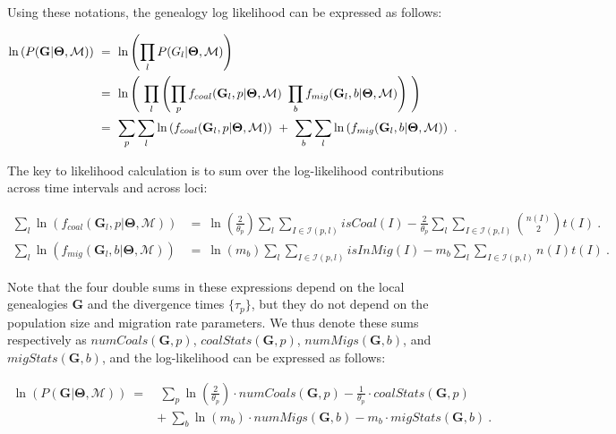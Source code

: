 \documentclass[11pt]{article}
\newcommand{\vect}[1]{\boldsymbol{\mathbf{#1}}}
\newcommand{\M}{\mathcal{M}}
\newcommand{\G}{\vect{G}}
\newcommand{\T}{\vect{\Theta}}
\newcommand{\Ip}{\mathcal{I}(p,l)}
\newcommand{\Ib}{\mathcal{I}(b,l)}
\newcommand{\1}{\mathbbm{1}}
\begin{document}
Using these notations, the genealogy log likelihood can be expressed as follows:
%
%
\begin{small}
\begin{align}
\ln \left( P(\G| \T,\M) \right) ~&=~ \ln \left( \prod_{l}  P(G_l| \T,\M) \right)  \notag \\ 
%
&=~  \ln \left( ~\prod_{l}  \left( \prod_{p} f_{coal}(\G_l,p|\T,\M) ~ \prod_{b} f_{mig}(\G_l,b|\T,\M) \right) ~\right) \notag \\ 
%
&=~  \sum_{p}\sum_{l}\ln \left( f_{coal}(\G_l,p|\T,\M) \right) ~ + ~ \sum_{b}\sum_{l}\ln \left( f_{mig}(\G_l,b|\T,\M) \right)~. 
\label{eqn:ld-details}
\end{align}
\end{small}

The key to likelihood calculation is to sum over the log-likelihood contributions across time intervals and across loci:
%
%
\begin{small}
\begin{align}
\sum_{l}\ln \left( f_{coal}(\G_l,p|\T,\M) \right) &=~ %
\ln\left( \frac{2}{\theta_p}\right) \sum_{l} \sum_{I \in \Ip} isCoal(I)  - \frac{2}{\theta_p} \sum_{l} \sum_{I \in \Ip}{n(I)\choose 2}t(I) ~.
\label{eqn:ld-coal-stats}\\
\sum_{l}\ln \left( f_{mig}(\G_l,b|\T,\M) \right) &=~ %
\ln\left( m_b\right) \sum_{l} \sum_{I \in \Ip} isInMig(I)  - m_b \sum_{l} \sum_{I \in \Ip}n(I) t(I) ~.
\label{eqn:ld-mig-stats}
\end{align}
\end{small}

Note that the four double sums in these expressions depend on the local genealogies $\G$ and the divergence times $\{\tau_p\}$, but they do not depend on the population size and migration rate parameters. We thus denote these sums respectively as $numCoals(\G,p)$, $coalStats(\G,p)$,  $numMigs(\G,b)$, and $migStats(\G,b)$, and the log-likelihood can be expressed as follows:
%
%
\begin{small}
\begin{align}
\ln \left( P(\G| \T,\M) \right) ~=&~ \sum_{p}  \ln\left( \frac{2}{\theta_p}\right)\cdot numCoals(\G,p) - \frac{1}{\theta_p}\cdot coalStats(\G,p) \\
& +~ \sum_{b}  \ln\left( m_b\right)\cdot numMigs(\G,b) - m_b \cdot migStats(\G,b) ~. 
\label{eqn:ld-final}
\end{align}
\end{small}
\end{document}
